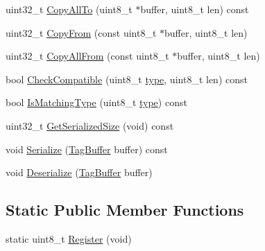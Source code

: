 \begin{DoxyCompactItemize}
uint32\+\_\+t \hyperlink{classns3_1_1Address_aeaaab8635590895225898456bc2ec697}{Copy\+All\+To} (uint8\+\_\+t $\ast$buffer, uint8\+\_\+t len) const 
\item 
uint32\+\_\+t \hyperlink{classns3_1_1Address_a14670b07f7ac98f6db43a71dd5c08c4e}{Copy\+From} (const uint8\+\_\+t $\ast$buffer, uint8\+\_\+t len)
\item 
uint32\+\_\+t \hyperlink{classns3_1_1Address_aaf5b61c614b93ec9e15b7d9266379087}{Copy\+All\+From} (const uint8\+\_\+t $\ast$buffer, uint8\+\_\+t len)
\item 
bool \hyperlink{classns3_1_1Address_a38688466338cf075e21fe45f7207c51f}{Check\+Compatible} (uint8\+\_\+t \hyperlink{visualizer-ideas_8txt_add98db9e15e2a58cf2b57623e7aa893a}{type}, uint8\+\_\+t len) const 
\item 
bool \hyperlink{classns3_1_1Address_a422a3d9f55b1a0acf4797c0ea77eb4e4}{Is\+Matching\+Type} (uint8\+\_\+t \hyperlink{visualizer-ideas_8txt_add98db9e15e2a58cf2b57623e7aa893a}{type}) const 
\item 
uint32\+\_\+t \hyperlink{classns3_1_1Address_ac392ce6234a84cad72531567bffb28ec}{Get\+Serialized\+Size} (void) const 
\item 
void \hyperlink{classns3_1_1Address_ad26c9029aa03d7a7d35db4c2623d576b}{Serialize} (\hyperlink{classns3_1_1TagBuffer}{Tag\+Buffer} buffer) const 
\item 
void \hyperlink{classns3_1_1Address_ae17749a37c8e47b428e8ed77c383c2e2}{Deserialize} (\hyperlink{classns3_1_1TagBuffer}{Tag\+Buffer} buffer)
\end{DoxyCompactItemize}
\subsection*{Static Public Member Functions}
\begin{DoxyCompactItemize}
\item 
static uint8\+\_\+t \hyperlink{classns3_1_1Address_a75d239c79bb3c39d64a8db4f2d3d9b20}{Register} (void)
\end{DoxyCompactItemize}
